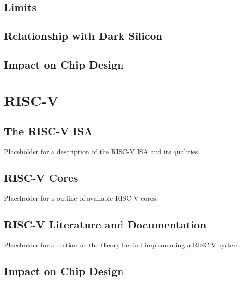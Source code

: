 		\subsection{Limits}
		
		\subsection{Relationship with Dark Silicon}
		
		\subsection{Impact on Chip Design}
		
	
	\section{RISC-V}
		\subsection{The RISC-V ISA}
			Placeholder for a description of the RISC-V ISA and its qualities.
			
		\subsection{RISC-V Cores}
			Placeholder for a outline of available RISC-V cores.
		
		\subsection{RISC-V Literature and Documentation}
			Placeholder for a section on the theory behind implementing a RISC-V system.
			
		\subsection{Impact on Chip Design}
		
